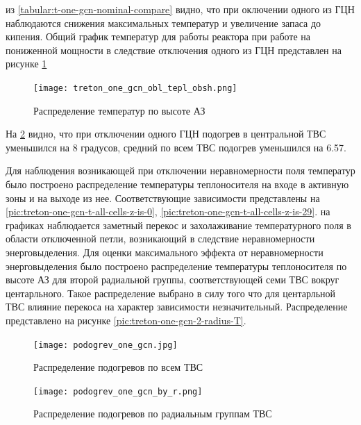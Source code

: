 из \ref{tabular:t-one-gcn-nominal-compare} видно, что при оключении одного из ГЦН наблюдаются снижения максимальных температур и увеличение запаса до кипения. Общий график температур для работы реактора при работе на пониженной мощности в следствие отключения одного из ГЦН представлен на рисунке \ref{pic:treton-one-gcn-obl-tepl-obsh}

\begin{figure}[H]
	\begin{center}
		\texttt{[image: treton\_one\_gcn\_obl\_tepl\_obsh.png]}
		\caption{Распределение температур по высоте АЗ}
		\label{pic:treton-one-gcn-obl-tepl-obsh} %
	\end{center}
\end{figure}

На \ref{pic:podogrev-one-gcn} видно, что при отключении одного ГЦН подогрев в центральной ТВС уменьшился на 8 градусов, средний по всем ТВС подогрев уменьшился на 6.57. 

Для наблюдения возникающей при отключении неравномерности поля температур было построено распределение температуры теплоносителя на входе в активную зоны и на выходе из нее. Соответствующие зависимости представлены на \ref{pic:treton-one-gcn-t-all-cells-z-is-0}, \ref{pic:treton-one-gcn-t-all-cells-z-is-29}. на графиках наблюдается заметный перекос и захолаживание температурного поля в области отключенной петли, возникающий в следствие неравномерности энерговыделения. Для оценки максимального эффекта от неравномерности энерговыделения было построено распределение температуры теплоносителя по высоте АЗ для второй радиальной группы, соответствующей семи ТВС вокруг центарльного. Такое распределение выбрано в силу того что для центарльной ТВС влияние перекоса на характер зависимости незначительный. Распределение представлено на рисунке \ref{pic:treton-one-gcn-2-radius-T}.

\begin{figure}[H]
	\begin{center}
		\texttt{[image: podogrev\_one\_gcn.jpg]}
		\caption{Распределение подогревов по всем ТВС}
		\label{pic:podogrev-one-gcn} %
	\end{center}
\end{figure}

\begin{figure}[H]
	\begin{center}
		\texttt{[image: podogrev\_one\_gcn\_by\_r.png]}
		\caption{Распределение подогревов по радиальным группам ТВС}
		\label{pic:podogrev-one-gcn-by-r} %
	\end{center}
\end{figure}

